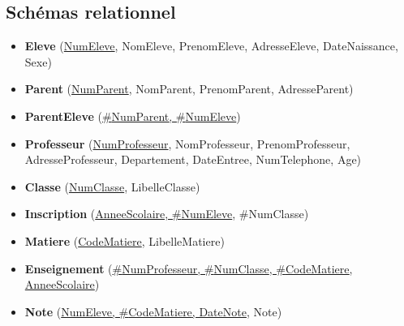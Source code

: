 \documentclass[a4paper,12pt]{article}
\begin{document}
\subsection{Schémas relationnel}
\begin{itemize}
  \item \textbf{Eleve} (\underline{NumEleve}, NomEleve, PrenomEleve, AdresseEleve, DateNaissance, Sexe)
  \item \textbf{Parent} (\underline{NumParent}, NomParent, PrenomParent, AdresseParent)
  \item \textbf{ParentEleve} (\underline{\#{NumParent}, \#{NumEleve}})
  \item \textbf{Professeur} (\underline{NumProfesseur}, NomProfesseur, PrenomProfesseur, AdresseProfesseur, Departement, DateEntree, NumTelephone, Age)
  \item \textbf{Classe} (\underline{NumClasse}, LibelleClasse)
  \item \textbf{Inscription} (\underline{AnneeScolaire, \#{NumEleve}}, \#{NumClasse})
  \item \textbf{Matiere} (\underline{CodeMatiere}, LibelleMatiere)
  \item \textbf{Enseignement} (\underline{\#{NumProfesseur}, \#{NumClasse}, \#{CodeMatiere}, AnneeScolaire})
  \item \textbf{Note} (\underline{NumEleve, \#{CodeMatiere}, DateNote}, Note)
\end{itemize}
\end{document}
